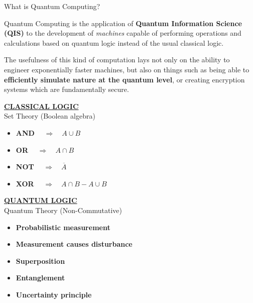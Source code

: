 \documentclass[9pt, handout, aspectratio=169]{beamer}		%
\begin{document}
	\begin{frame}{What is Quantum Computing?}

		\medskip

		Quantum Computing is the application of \textbf{Quantum Information Science (QIS)} to the development of \textit{machines} capable of performing operations and calculations based on quantum logic instead of the usual classical logic.

		\medskip

		The usefulness of this kind of computation lays not only on the ability to engineer exponentially faster machines, but also on things such as being able to \textbf{efficiently simulate nature at the quantum level}, or creating encryption systems which are fundamentally secure.

		\medskip

		\begin{multicols}{2}

			\underline{\textbf{CLASSICAL LOGIC}}\\
			Set Theory (Boolean algebra)

			\medskip

			\begin{itemize}
				\item \textbf{AND} $\quad \Rightarrow \quad A \cup B$
				\item \textbf{OR} $\quad \Rightarrow \quad A \cap B$
				\item \textbf{NOT} $\quad \Rightarrow \quad \overline{A}$
				\item \textbf{XOR} $ \quad \Rightarrow \quad A \cap B - A \cup B$
			\end{itemize}

			\columnbreak

			\underline{\textbf{	QUANTUM LOGIC}}\\
			Quantum Theory (Non-Commutative)

			\medskip

			\begin{itemize}
				\item \textbf{Probabilistic measurement}
				\item \textbf{Measurement causes disturbance}
				\item \textbf{Superposition}
				\item \textbf{Entanglement}
				\item \textbf{Uncertainty principle}
			\end{itemize}

		\end{multicols}

	\end{frame}
\end{document}
